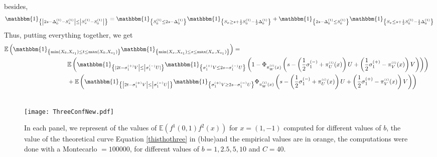 \documentclass[12pt]{article}
\theoremstyle{Theorem}
\theoremstyle{definition}
\begin{document}
besides,  
\begin{align*}
\mathbbm{1}_{\left\{ \left|2s - \Delta^{(1)}_{0} -  S^{\scriptscriptstyle (1)}_{x}  \right| \leq \left|S^{\scriptscriptstyle (1)}_{x} - S^{\scriptscriptstyle (1)}_{0}\right|\right\}} 
&= \mathbbm{1}_{\left\{  S^{\scriptscriptstyle (1)}_{0} \leq 2s - \Delta^{(1)}_{0}\right\}} \mathbbm{1}_{\left\{ S_{x} \geq s+ \frac{1}{2}S^{\scriptscriptstyle (1)}_{0} - \frac{1}{2}\Delta^{\scriptscriptstyle (1)}_{0}\right\}} + \mathbbm{1}_{\left\{  2s - \Delta^{(1)}_{0} \leq S^{\scriptscriptstyle (1)}_{0} \right\}} \mathbbm{1}_{\left\{ S_{x} \leq  s+ \frac{1}{2}S^{\scriptscriptstyle (1)}_{0} - \frac{1}{2}\Delta^{\scriptscriptstyle (1)}_{0} \right\}} \\
\end{align*} 
Thus, putting everything together, we get 
{\small 
\begin{align*}
\mathbb{E}\left(\mathbbm{1}_{\left\{\min(X_{\scriptscriptstyle 0}, X_{e_1}) \leq t \leq \max(X_{\scriptscriptstyle 0}, X_{e_1})\right\}}\mathbbm{1}_{\left\{\min(X_{x}, X_{e_1}) \leq s \leq \max(X_{x}, X_{e_1}) \right\}}\right) = \\
& \hspace{-10cm} \mathbb{E}\left(\mathbbm{1}_{\left\{|2t - \sigma^{(+)}_{1}V\right| \leq  \left|\sigma^{(-)}_{1}U|\right\}}\mathbbm{1}_{\left\{ \sigma^{(+)}_{1}V  \leq 2s - \sigma^{(-)}_{1}U\right\}} \left(1 - \Phi_{\pi^{\scriptscriptstyle(i)}_{W}(x) }\left(s - \left(\frac{1}{2}\sigma^{(-)}_{1} + \pi^{\scriptscriptstyle(i)}_{U}(x)\right)U  +  \left(\frac{1}{2}\sigma^{(+)}_{1} - \pi^{\scriptscriptstyle(i)}_{V}(x)\right)V\right)\right)\right)\\
& \hspace{-10cm}+ \mathbb{E}\left(\mathbbm{1}_{\left\{\left|2t - \sigma^{(+)}_{1}V\right|\leq  \left|\sigma^{(-)}_{1}U\right|\right\}}\mathbbm{1}_{\left\{ \sigma^{(+)}_{1}V  \geq 2s - \sigma^{(-)}_{1}U\right\}}\Phi_{\pi^{\scriptscriptstyle(i)}_{W}(x) }\left(s - \left(\frac{1}{2}\sigma^{(-)}_{1} + \pi^{\scriptscriptstyle(i)}_{U}(x)\right)U  +  \left(\frac{1}{2}\sigma^{(+)}_{1}- \pi^{\scriptscriptstyle(i)}_{V}(x)\right)V\right) \right)\\\
\end{align*}
}
\begin{figure}[H]
  \centering
    {\texttt{[image: ThreeConfNew.pdf]}}
    \hspace{0.2cm}
 \caption{In each panel, we represent of the values of $\mathbb{E}\left(f^{1}(0,1)f^{2}(x)\right)$ for $x = (1,-1)$ computed for different values of $b$, the value of the theoretical curve Equation \eqref{thisthothree} in (blue)and the empirical values are in orange, the computations were done with a Montecarlo $= 100000$, for different values of $b = 1, 2.5, 5, 10$ and $C = 40$. }
\label{figThreeconfnew}
\end{figure}
\end{document}
